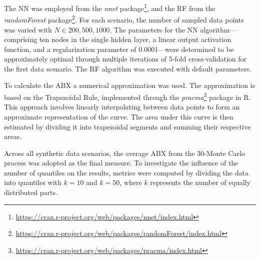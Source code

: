 The \gls{NN} was employed from the \textit{nnet} package\footnote{\url{https://cran.r-project.org/web/packages/nnet/index.html}}, and the \gls{RF} from the \textit{randomForest} package\footnote{\url{https://cran.r-project.org/web/packages/randomForest/index.html}}. For each scenario, the number of sampled data points was varied with $N \in {200,500,1000}$. The parameters for the \gls{NN} algorithm—comprising ten nodes in the single hidden layer, a linear output activation function, and a regularization parameter of 0.0001—were determined to be approximately optimal through multiple iterations of 5-fold cross-validation for the first data scenario. The \gls{RF} algorithm was executed with default parameters.

To calculate the \gls{ABX} a numerical approximation was used. The approximation is based on the Trapezoidal Rule, implemented through the \textit{pracma}\footnote{\url{https://cran.r-project.org/web/packages/pracma/index.html}} package in R. This approach involves linearly interpolating between data points to form an approximate representation of the curve. The area under this curve is then estimated by dividing it into trapezoidal segments and summing their respective areas. 

Across all synthetic data scenarios, the average \gls{ABX} from the 30-Monte Carlo process was adopted as the final measure. To investigate the influence of the number of quantiles on the results, metrics were computed by dividing the data into quantiles with \(k=10\) and \(k=50\), where \(k\) represents the number of equally distributed parts.